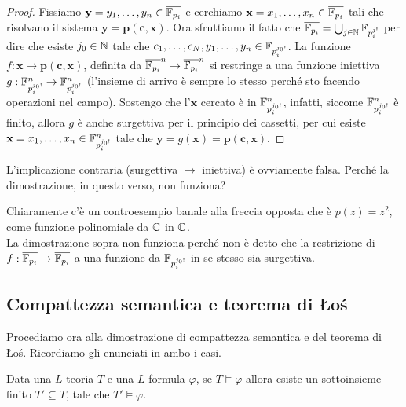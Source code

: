 \begin{proof}
    Fissiamo $\mathbf y = y_1,\ldots,y_n \in \overline{\mathbb F_{p_i}}$ e cerchiamo $\mathbf x = x_1,\ldots,x_n \in \overline{\mathbb F_{p_i}}$ tali che
    risolvano il sistema $\mathbf{y} = \mathbf{p}(\mathbf c, \mathbf x)$. Ora sfruttiamo il fatto che $\overline{\mathbb F_{p_i}} = \bigcup_{j \in \mathbb N} \mathbb F_{p_i^{j!}}$ per dire che esiste $j_0 \in \mathbb N$ tale che $c_1,\ldots,c_N,y_1,\ldots,y_n \in \mathbb F_{p_i^{j_0!}}$.
    La funzione $f : \mathbf{x} \mapsto \mathbf{p}(\mathbf{c},\mathbf{x})$, definita da $\overline{\mathbb F_{p_i}}^n \to \overline{\mathbb F_{p_i}}^n$ si restringe a una funzione iniettiva $g : \mathbb F_{p_i^{j_0!}}^n \to \mathbb F_{p_i^{j_0!}}^n$ (l'insieme di arrivo è sempre lo stesso perché sto facendo operazioni nel campo).
    Sostengo che l'$\mathbf{x}$ cercato è in $\mathbb F_{p_i^{j_0!}}^n$, infatti, siccome $\mathbb F_{p_i^{j_0!}}^n$ è finito, allora $g$ è anche surgettiva per il principio dei cassetti, per cui esiste $\mathbf{x} = x_1,\ldots,x_n \in \mathbb F_{p_i^{j_0!}}^n$ tale che $\mathbf{y} = g(\mathbf{x}) = \mathbf{p}(\mathbf{c},\mathbf{x})$.
\end{proof}

\begin{exercise}
    L'implicazione contraria (surgettiva $\to$ iniettiva) è ovviamente falsa. Perché la dimostrazione, in questo verso, non funziona?
\end{exercise}

\begin{soln}
    Chiaramente c'è un controesempio banale alla freccia opposta che è $p(z) = z^2$, come funzione polinomiale da $\mathbb C$ in $\mathbb C$.\\
    La dimostrazione sopra non funziona perché non è detto che la restrizione di $f : \overline{\mathbb F_{p_i}} \to \overline{\mathbb F_{p_i}}$ a una funzione da $\mathbb F_{p_i^{j_0!}}$ in se stesso sia surgettiva.
\end{soln}

\subsection{Compattezza semantica e teorema di Łoś}

Procediamo ora alla dimostrazione di compattezza semantica e del teorema di Łoś. Ricordiamo gli enunciati in ambo i casi.

\begin{theorem}
    Data una $L$-teoria $T$ e una $L$-formula $\varphi$, se $T \models \varphi$ allora esiste un sottoinsieme finito $T' \subseteq T$,
    tale che $T' \models \varphi$.
\end{theorem}

